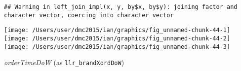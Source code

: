 \documentclass[10pt]{report}
\newenvironment{Shaded}{}{}
\newcommand{\KeywordTok}[1]{\textcolor[rgb]{0.00,0.44,0.13}{\textbf{{#1}}}}
\newcommand{\DataTypeTok}[1]{\textcolor[rgb]{0.56,0.13,0.00}{{#1}}}
\newcommand{\StringTok}[1]{\textcolor[rgb]{0.25,0.44,0.63}{{#1}}}
\newcommand{\NormalTok}[1]{{#1}}
\begin{document}
\begin{Shaded}
\end{Shaded}

\begin{verbatim}
## Warning in left_join_impl(x, y, by$x, by$y): joining factor and character vector, coercing into character vector
\end{verbatim}

\begin{Shaded}
\end{Shaded}

\begin{center}\texttt{[image: /Users/user/dmc2015/ian/graphics/fig\_unnamed-chunk-44-1]} \texttt{[image: /Users/user/dmc2015/ian/graphics/fig\_unnamed-chunk-44-2]} \texttt{[image: /Users/user/dmc2015/ian/graphics/fig\_unnamed-chunk-44-3]} \end{center}

\emph{orderTimeDoW} (as \texttt{llr\_brandXordDoW})
\end{document}
